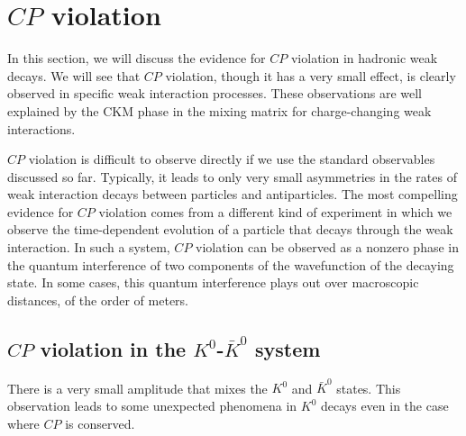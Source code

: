 \documentclass[../../main/main.tex]{subfiles}
\begin{document}





\section{\( CP \) violation}
In this section, we will discuss the evidence for \( CP \) violation in hadronic weak decays. We will see that \( CP \) violation, though it has a very small effect, is clearly observed in specific weak interaction processes. These observations are well explained by the CKM phase in the mixing matrix for charge-changing weak interactions.

\( CP \) violation is difficult to observe directly if we use the standard observables discussed so far. Typically, it leads to only very small asymmetries in the rates of weak interaction decays between particles and antiparticles. The most compelling evidence for \( CP \) violation comes from a different kind of experiment in which we observe the time-dependent evolution of a particle that decays through the weak interaction. In such a system, \( CP \) violation can be observed as a nonzero phase in the quantum interference of two components of the wavefunction of the decaying state. In some cases, this quantum interference plays out over macroscopic distances, of the order of meters.



\subsection{\( CP \) violation in the \( K^0 \)-\( \bar{K}^0 \) system}
There is a very small amplitude that mixes the \( K^0 \) and \( \bar{K}^0 \) states. This observation leads to some unexpected phenomena in \( K^0 \) decays even in the case where \( CP \) is conserved.
\end{document}
